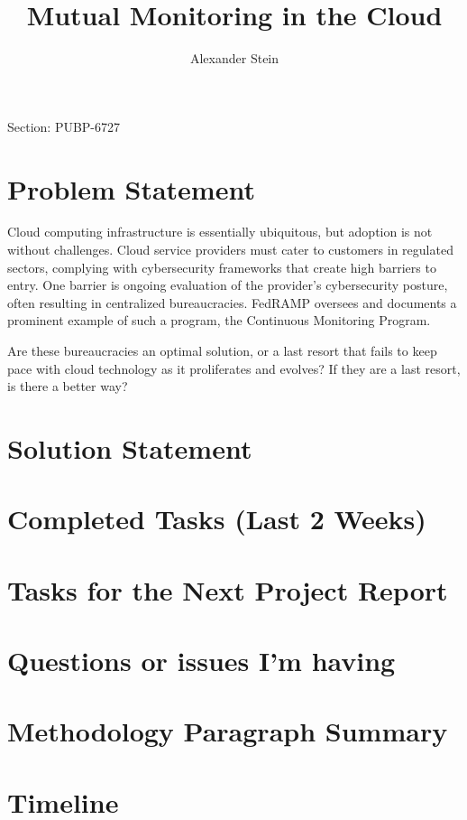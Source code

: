 \documentclass{jdf}
\begin{document}
Section: PUBP-6727
\title{Mutual Monitoring in the Cloud}
\author{Alexander Stein}

\maketitle
\thispagestyle{fancy}

\section{Problem Statement}

Cloud computing infrastructure is essentially ubiquitous, but adoption is not without challenges. Cloud service providers must cater to customers in regulated sectors, complying with cybersecurity frameworks that create high barriers to entry. One barrier is ongoing evaluation of the provider's cybersecurity posture, often resulting in centralized bureaucracies. FedRAMP oversees and documents a prominent example of such a program, the Continuous Monitoring Program.

Are these bureaucracies an optimal solution, or a last resort that fails to keep pace with cloud technology as it proliferates and evolves? If they are a last resort, is there a better way?

\section{Solution Statement}

\section{Completed Tasks (Last 2 Weeks)}

\section{Tasks for the Next Project Report}

\section{Questions or issues I'm having}

\section{Methodology Paragraph Summary}

\section{Timeline}
\end{document}
